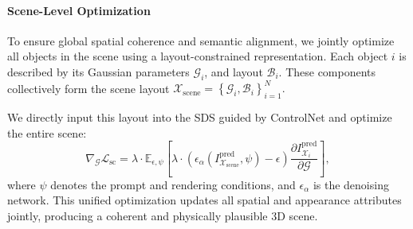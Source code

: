 \documentclass[sigconf]{acmart}
\begin{document}
\paragraph{Scene-Level Optimization}

To ensure global spatial coherence and semantic alignment, we jointly optimize all objects in the scene using a layout-constrained representation. Each object $i$ is described by its Gaussian parameters $\mathcal{G}_i$, and layout $\mathcal{B}_i$. These components collectively form the scene layout $\mathcal{X}_{\text{scene}} = \left\{ \mathcal{G}_i, \mathcal{B}_i \right\}_{i=1}^N.$

We directly input this layout into the SDS guided by ControlNet and optimize the entire scene:
\begin{equation}
    \nabla_{\mathcal{G}} \mathcal{L}_{\text{sc}} = \lambda \cdot \mathbb{E}_{\epsilon, \psi} \left[ \lambda \cdot \left( \epsilon_\alpha\left(I_{\mathcal{X}_{\text{scene}}}^{\text{pred}}, \psi\right) - \epsilon \right) \frac{\partial I_{\mathcal{X}_{i}}^{\text{pred}}}{\partial \mathcal{G}} \right],
\end{equation}
where $\psi$ denotes the prompt and rendering conditions, and $\epsilon_\alpha$ is the denoising network. This unified optimization updates all spatial and appearance attributes jointly, producing a coherent and physically plausible 3D scene.



\end{document}
